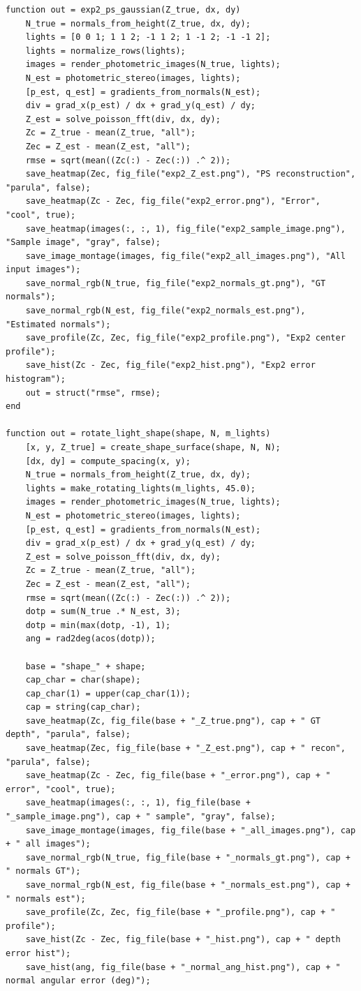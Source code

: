 \documentclass[11pt]{article}
\begin{document}
\begin{lstlisting}[caption={Minimal MATLAB photometric stereo + Poisson solver},label={lst:synthetic_ps_min}]
function out = exp2_ps_gaussian(Z_true, dx, dy)
    N_true = normals_from_height(Z_true, dx, dy);
    lights = [0 0 1; 1 1 2; -1 1 2; 1 -1 2; -1 -1 2];
    lights = normalize_rows(lights);
    images = render_photometric_images(N_true, lights);
    N_est = photometric_stereo(images, lights);
    [p_est, q_est] = gradients_from_normals(N_est);
    div = grad_x(p_est) / dx + grad_y(q_est) / dy;
    Z_est = solve_poisson_fft(div, dx, dy);
    Zc = Z_true - mean(Z_true, "all");
    Zec = Z_est - mean(Z_est, "all");
    rmse = sqrt(mean((Zc(:) - Zec(:)) .^ 2));
    save_heatmap(Zec, fig_file("exp2_Z_est.png"), "PS reconstruction", "parula", false);
    save_heatmap(Zc - Zec, fig_file("exp2_error.png"), "Error", "cool", true);
    save_heatmap(images(:, :, 1), fig_file("exp2_sample_image.png"), "Sample image", "gray", false);
    save_image_montage(images, fig_file("exp2_all_images.png"), "All input images");
    save_normal_rgb(N_true, fig_file("exp2_normals_gt.png"), "GT normals");
    save_normal_rgb(N_est, fig_file("exp2_normals_est.png"), "Estimated normals");
    save_profile(Zc, Zec, fig_file("exp2_profile.png"), "Exp2 center profile");
    save_hist(Zc - Zec, fig_file("exp2_hist.png"), "Exp2 error histogram");
    out = struct("rmse", rmse);
end

function out = rotate_light_shape(shape, N, m_lights)
    [x, y, Z_true] = create_shape_surface(shape, N, N);
    [dx, dy] = compute_spacing(x, y);
    N_true = normals_from_height(Z_true, dx, dy);
    lights = make_rotating_lights(m_lights, 45.0);
    images = render_photometric_images(N_true, lights);
    N_est = photometric_stereo(images, lights);
    [p_est, q_est] = gradients_from_normals(N_est);
    div = grad_x(p_est) / dx + grad_y(q_est) / dy;
    Z_est = solve_poisson_fft(div, dx, dy);
    Zc = Z_true - mean(Z_true, "all");
    Zec = Z_est - mean(Z_est, "all");
    rmse = sqrt(mean((Zc(:) - Zec(:)) .^ 2));
    dotp = sum(N_true .* N_est, 3);
    dotp = min(max(dotp, -1), 1);
    ang = rad2deg(acos(dotp));

    base = "shape_" + shape;
    cap_char = char(shape);
    cap_char(1) = upper(cap_char(1));
    cap = string(cap_char);
    save_heatmap(Zc, fig_file(base + "_Z_true.png"), cap + " GT depth", "parula", false);
    save_heatmap(Zec, fig_file(base + "_Z_est.png"), cap + " recon", "parula", false);
    save_heatmap(Zc - Zec, fig_file(base + "_error.png"), cap + " error", "cool", true);
    save_heatmap(images(:, :, 1), fig_file(base + "_sample_image.png"), cap + " sample", "gray", false);
    save_image_montage(images, fig_file(base + "_all_images.png"), cap + " all images");
    save_normal_rgb(N_true, fig_file(base + "_normals_gt.png"), cap + " normals GT");
    save_normal_rgb(N_est, fig_file(base + "_normals_est.png"), cap + " normals est");
    save_profile(Zc, Zec, fig_file(base + "_profile.png"), cap + " profile");
    save_hist(Zc - Zec, fig_file(base + "_hist.png"), cap + " depth error hist");
    save_hist(ang, fig_file(base + "_normal_ang_hist.png"), cap + " normal angular error (deg)");


\end{lstlisting}
\end{document}
